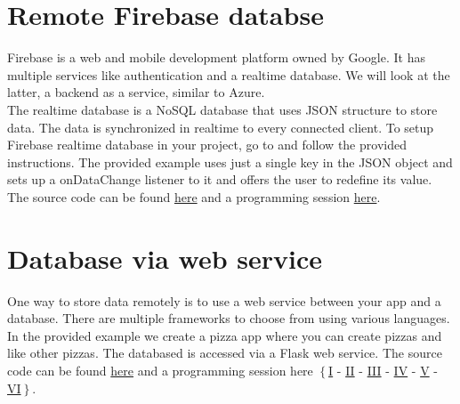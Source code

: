 \section{Remote Firebase databse}
Firebase is a web and mobile development platform owned by Google. It has multiple services like authentication and a realtime database. We will look at the latter, a backend as a service, similar to Azure.\\

The realtime database is a NoSQL database that uses JSON structure to store data. The data is synchronized in realtime to every connected client. To setup Firebase realtime database in your project, go to  and follow the provided instructions. The provided example uses just a single key in the JSON object and sets up a onDataChange listener to it and offers the user to redefine its value. The source code can be found \href{https://github.com/JonSteinn/AndroidDevelopment/tree/master/examples/lab5/firebase}{here} and a programming session \href{https://www.youtube.com/watch?v=TmHsO5nmy7s}{here}.

\section{Database via web service}
One way to store data remotely is to use a web service between your app and a database. There are multiple frameworks to choose from using various languages. In the provided example we create a pizza app where you can create pizzas and like other pizzas. The databased is accessed via a Flask web service. The source code can be found \href{https://github.com/JonSteinn/AndroidDevelopment/tree/master/examples/lab5/webservice}{here} and a programming session here $\left\{\right.$\href{https://youtu.be/CEA9KUqzHGU}{I} - \href{https://youtu.be/QJ47HknYbEs}{II} - \href{https://youtu.be/ytR8qfVj1gU}{III} - \href{https://youtu.be/mjHSuKgRvgE}{IV} - \href{https://youtu.be/2BJmIf9at40}{V} - \href{https://youtu.be/bcOkPMBaU74}{VI}$\left.\right\}$.

